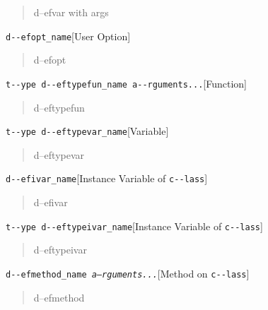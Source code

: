 \documentclass{book}
\begin{document}
\begin{titlepage}
%
\begin{quote}
\unskip{\parskip=0pt\noindent}%
d--efvar with args
\end{quote}

\noindent\texttt{d{-}{-}efopt\_name}\hfill[User Option]

%
\begin{quote}
\unskip{\parskip=0pt\noindent}%
d--efopt
\end{quote}

\noindent\texttt{t{-}{-}ype d{-}{-}eftypefun\_name a{-}{-}rguments...}\hfill[Function]

%
\begin{quote}
\unskip{\parskip=0pt\noindent}%
d--eftypefun
\end{quote}

\noindent\texttt{t{-}{-}ype d{-}{-}eftypevar\_name}\hfill[Variable]

%
\begin{quote}
\unskip{\parskip=0pt\noindent}%
d--eftypevar
\end{quote}

\noindent\texttt{d{-}{-}efivar\_name}\hfill[Instance Variable of \texttt{c{-}{-}lass}]

%
\begin{quote}
\unskip{\parskip=0pt\noindent}%
d--efivar
\end{quote}

\noindent\texttt{t{-}{-}ype d{-}{-}eftypeivar\_name}\hfill[Instance Variable of \texttt{c{-}{-}lass}]

%
\begin{quote}
\unskip{\parskip=0pt\noindent}%
d--eftypeivar
\end{quote}

\noindent\texttt{d{-}{-}efmethod\_name \EmbracOn{}\textnormal{\textsl{a--rguments...}}\EmbracOff{}}\hfill[Method on \texttt{c{-}{-}lass}]

%
\begin{quote}
\unskip{\parskip=0pt\noindent}%
d--efmethod
\end{quote}


\end{titlepage}
\end{document}
